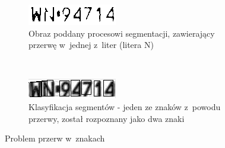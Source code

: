 \begin{figure}
  \centering
  \begin{subfigure}[b]{0.45\textwidth}
    \includegraphics[width=\textwidth]{img/result-przerwa-bad}
    \caption{Obraz poddany procesowi segmentacji, zawierający przerwę w~jednej z~liter (litera N)}
    \label{fig:result_euro_input}
  \end{subfigure}
  ~
  \begin{subfigure}[b]{0.45\textwidth}
    \includegraphics[width=\textwidth]{img/result-przerwa-output}
    \caption{Klasyfikacja segmentów - jeden ze znaków z~powodu przerwy, został rozpoznany jako dwa znaki}
    \label{fig:result_euro_bad}
  \end{subfigure}
  \caption{Problem przerw w~znakach }
  \label{fig:result_przerwa}
\end{figure}
